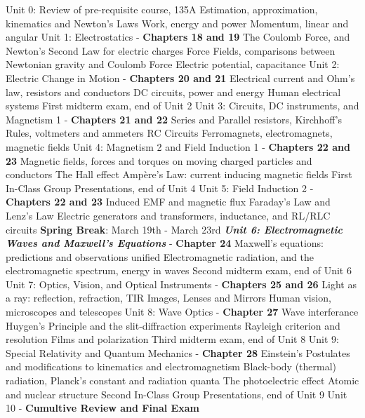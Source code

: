 \documentclass[10pt]{article}
\begin{document}
\begin{outline}[enumerate]
\1 Unit 0: Review of pre-requisite course, 135A
\2 Estimation, approximation, kinematics and Newton's Laws
\2 Work, energy and power
\2 Momentum, linear and angular
\1 Unit 1: Electrostatics - \textbf{Chapters 18 and 19}
\2 The Coulomb Force, and Newton's Second Law for electric charges
\2 Force Fields, comparisons between Newtonian gravity and Coulomb Force
\2 Electric potential, capacitance
\1 Unit 2: Electric Change in Motion - \textbf{Chapters 20 and 21}
\2 Electrical current and Ohm's law, resistors and conductors
\2 DC circuits, power and energy
\2 Human electrical systems
\1 First midterm exam, end of Unit 2
\1 Unit 3: Circuits, DC instruments, and Magnetism 1 - \textbf{Chapters 21 and 22}
\2 Series and Parallel resistors, Kirchhoff's Rules, voltmeters and ammeters
\2 RC Circuits
\2 Ferromagnets, electromagnets, magnetic fields
\1 Unit 4: Magnetism 2 and Field Induction 1 - \textbf{Chapters 22 and 23}
\2 Magnetic fields, forces and torques on moving charged particles and conductors
\2 The Hall effect
\2 Amp\`{e}re's Law: current inducing magnetic fields
\1 First In-Class Group Presentations, end of Unit 4
\1 Unit 5: Field Induction 2 - \textbf{Chapters 22 and 23}
\2 Induced EMF and magnetic flux
\2 Faraday's Law and Lenz's Law
\2 Electric generators and transformers, inductance, and RL/RLC circuits
\1 \textbf{Spring Break}: March 19th - March 23rd
\1 \textit{\textbf{ Unit 6: Electromagnetic Waves and Maxwell's Equations}} - \textbf{Chapter 24}
\2 Maxwell's equations: predictions and observations unified
\2 Electromagnetic radiation, and the electromagnetic spectrum, energy in waves
\1 Second midterm exam, end of Unit 6
\1 Unit 7: Optics, Vision, and Optical Instruments - \textbf{Chapters 25 and 26}
\2 Light as a ray: reflection, refraction, TIR
\2 Images, Lenses and Mirrors
\2 Human vision, microscopes and telescopes
\1 Unit 8: Wave Optics - \textbf{Chapter 27}
\2 Wave interferance
\2 Huygen's Principle and the slit-diffraction experiments
\2 Rayleigh criterion and resolution
\2 Films and polarization
\1 Third midterm exam, end of Unit 8
\1 Unit 9: Special Relativity and Quantum Mechanics - \textbf{Chapter 28}
\2 Einstein's Postulates and modifications to kinematics and electromagnetism
\2 Black-body (thermal) radiation, Planck's constant and radiation quanta
\2 The photoelectric effect
\2 Atomic and nuclear structure
\1 Second In-Class Group Presentations, end of Unit 9
\1 Unit 10 - \textbf{Cumultive Review and Final Exam}
\end{outline}
\end{document}
